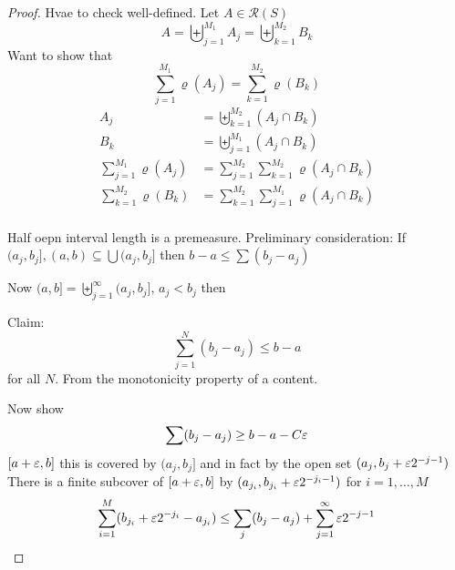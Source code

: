 \begin{proof}
  Hvae to check well-defined.  
  Let $A \in \mathcal{R}(S)$
  \[A = \biguplus_{j=1}^{M_1} A_j = \biguplus_{k=1}^{M_2} B_k \]
  Want to show that
  \[\sum_{j=1}^{M_1} \varrho(A_j) = \sum_{k=1}^{M_2} \varrho(B_k)\]
  \begin{align*}
    A_j &= \biguplus_{k=1}^{M_2} (A_j \cap B_k) \\
    B_k &= \biguplus_{j=1}^{M_1} (A_j \cap B_k) \\
    \sum_{j=1}^{M_1} \varrho(A_j) &= \sum_{j=1}^{M_2} \sum_{k=1}^{M_2} \varrho(A_j \cap B_k) \\
    \sum_{k=1}^{M_2} \varrho(B_k) &= \sum_{k=1}^{M_2} \sum_{j=1}^{M_1} \varrho(A_j \cap B_k) \\
  \end{align*}

Half oepn interval length is a premeasure.
Preliminary consideration: If $(a_j, b_j], (a, b) \subseteq \bigcup(a_j, b_j]$ then
$b-a \le \sum (b_j - a_j)$

Now $(a, b] = \biguplus_{j=1}^\infty (a_j, b_j]$, $a_j < b_j$ then 

Claim:
\[\sum_{j=1}^N (b_j - a_j) \le b-a\]
for all $N$. From the monotonicity property of a content.

Now show 
\[\sum (b_j - a_j) \ge b-a-C\varepsilon\]
$[a+\varepsilon, b]$ this is covered by $(a_j, b_j]$
and in fact by the open set $(a_j, b_j + \varepsilon 2^{-j-1})$
There is a finite subcover of $[a + \varepsilon, b]$ by $(a_{j_i}, b_{j_i} + \varepsilon 2^{-j_i-1})$ for $i = 1, \dotsc, M$
$$\sum_{i=1}^M (b_{j_i} + \varepsilon 2^{-j_i} - a_{j_i}) \le \sum_{j} (b_j - a_j) + \sum_{j=1}^\infty \varepsilon2^{-j-1}$$

\end{proof}